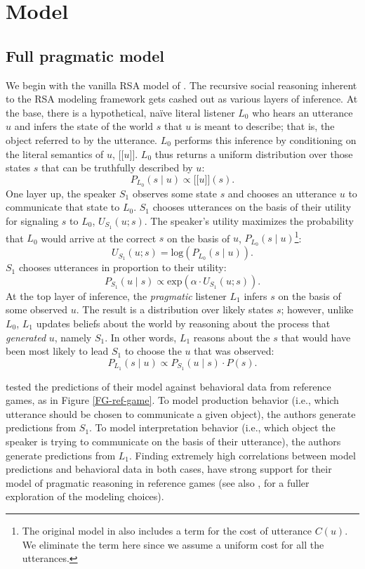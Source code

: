 \documentclass[10pt,a4paper]{article}
\newcommand{\sem}[1]{\mbox{$[\![$#1$]\!]$}}
\begin{document}
\section{Model}
\subsection{Full pragmatic model}

We begin with the vanilla RSA model of . The recursive social reasoning inherent to the RSA modeling framework gets cashed out as various layers of inference. At the base, there is a hypothetical, na\"ive literal listener $L_0$ who hears an utterance $u$ and infers the state of the world $s$ that $u$ is meant to describe; that is, the object referred to by the utterance. $L_0$ performs this inference by conditioning on the literal semantics of $u$, \sem{$u$}. $L_0$ thus returns a uniform distribution over those states $s$ that can be truthfully described by $u$:
$$P_{L_{0}}(s\mid u) \propto \sem{$u$}(s).$$
One layer up, the speaker $S_1$ observes some state $s$ and chooses an utterance $u$ to communicate that state to $L_0$. $S_1$ chooses utterances on the basis of their utility for signaling $s$ to $L_0$, $U_{S_1}(u;s)$. The speaker's utility maximizes the probability that $L_0$ would arrive at the correct $s$ on the basis of $u$, $P_{L_{0}}(s\mid u)$\footnote{The original model in  also includes a term for the cost of utterance $C(u)$. We eliminate the term here since we assume a uniform cost for all the utterances.}:
$$U_{S_{1}}(u;s) = \textrm{log}(P_{L_{0}}(s\mid u)).$$ 
$S_1$ chooses utterances in proportion to their utility:
$$P_{S_{1}} (u\mid s) \propto   \textrm{exp}(\alpha \cdot U_{S_{1}} (u;s)).$$
At the top layer of inference, the \emph{pragmatic} listener $L_1$ infers $s$ on the basis of some observed $u$. The result is a distribution over likely states $s$; however, unlike $L_0$, $L_1$ updates beliefs about the world by reasoning about the process that \emph{generated} $u$, namely $S_1$. In other words, $L_1$ reasons about the $s$ that would have been most likely to lead $S_1$ to choose the $u$ that was observed:
$$P_{L_{1}}(s\mid u) \propto P_{S_{1}}(u\mid s) \cdot P(s).$$

 tested the predictions of their model against behavioral data from reference games, as in Figure \ref{FG-ref-game}. To model production behavior (i.e., which utterance should be chosen to communicate a given object), the authors generate predictions from $S_1$. To model interpretation behavior (i.e., which object the speaker is trying to communicate on the basis of their utterance), the authors generate predictions from $L_1$. Finding extremely high correlations between model predictions and behavioral data in both cases, \citeauthor{frankgoodman2012} have strong support for their model of pragmatic reasoning in reference games (see also , for a fuller exploration of the modeling choices).
\end{document}
